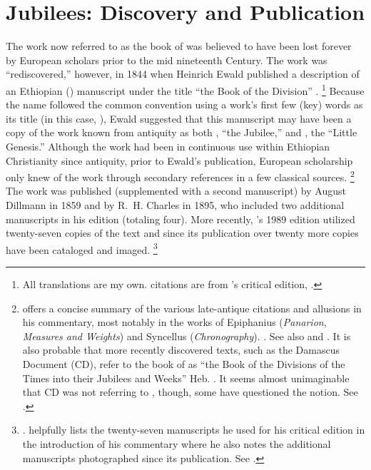 \section{Jubilees: Discovery and Publication}
The work now referred to as the book of \jub was believed to have been lost forever by European scholars prior to the mid nineteenth Century. The work was ``rediscovered,'' however, in 1844 when Heinrich Ewald published a description of an Ethiopian (\geez) manuscript under the title ``the Book of the Division'' .%
        \footnote{All translations are my own. \geez citations are from \vanderkam's critical edition, \cite*{vanderkam1989}.}
Because the name followed the common convention using a work's first few (key) words as its title (in this case, ), Ewald suggested that this manuscript may have been a copy of the work known from antiquity as both , ``the Jubilee,'' and , the ``Little Genesis.''\autocite[176--179]{ewald_zkm1844} Although the work had been in continuous use within Ethiopian Christianity since antiquity, prior to Ewald's publication, European scholarship only knew of the work through secondary references in a few classical sources.%
        \footnote{\vanderkam offers a concise summary of the various late-antique citations and allusions in his commentary, most notably in the works of Epiphanius (\emph{Panarion}, \emph{Measures and Weights}) and Syncellus (\emph{Chronography}).
                \cite[1:10--14]{vanderkam2018}. See also 
                \cite{reed_kister-etal2015} and 
                \cite{kreps_ch2018}.
        It is also probable that more recently discovered texts, such as the Damascus Document (CD), refer to the book of \jub as 
        ``the Book of the Divisions of the Times into their Jubilees and Weeks'' Heb. . It seems almost unimaginable that CD was not referring to \jub, though, some have questioned the notion. See \cite[242--248]{dimant_vanderkam-etal2006}.}
The work was published (supplemented with a second manuscript) by August Dillmann in 1859\autocite{dillmann1859} and by R.~H. Charles in 1895, who included two additional manuscripts in his edition (totaling four).\autocite{charles1895} More recently, \vanderkam's 1989 edition utilized twenty-seven copies of the text\autocite[1:xiv--xvi]{vanderkam1989} and since its publication over twenty more copies have been cataloged and imaged.%
        \footnote{%
                \cite{erho_bsoas2013}.
                \vanderkam helpfully lists the twenty-seven manuscripts he used for his critical edition in the introduction of his commentary where he also notes the additional manuscripts photographed since its publication. See 
                \cite[1:14--16]{vanderkam2018}.}

